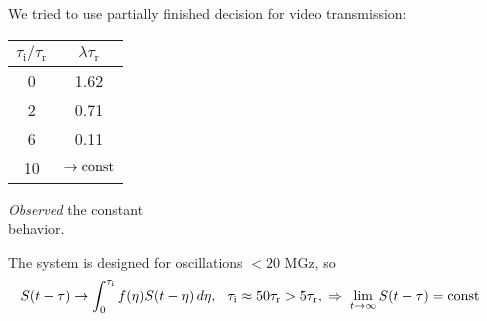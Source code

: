 
\begin{minipage}{0.75\textwidth}
      We tried to use partially finished decision for video transmission:
    \begin{center}
    \end{center}
\end{minipage}
\hfill
\begin{minipage}{0.2\textwidth}
    \begin{tabular}{c|c}
     $\tau_\text{i} / \tau_{\text{r}}$ & $\lambda \tau_{\text{r}}$ \\
     \hline
     0 & 1.62 \\ 
     2 & 0.71 \\
     6 & 0.11 \\
     10 & $\to \text{const}$ \\
    \end{tabular}

    \phantom{42}

    \textit{Observed} the constant \\ behavior.
\end{minipage}



The system is designed for oscillations $< 20$ MGz, so
\vspace{-2mm}
\begin{equation*}
    \hspace{-5mm}
    S(t - \tau) \to \int_{0}^{\tau_\text{i}} f(\eta) S(t-\eta) \d\eta,
    \hspace{2.5 mm} 
    \tau_\text{i} \approx 50 \tau_{\text{r}} > 5 \tau_{\text{r}},
    \hspace{0.1cm} \Rightarrow \hspace{0.1cm}
    \lim_{t \to \infty} S(t-\tau) = \const
\end{equation*}



% 

%